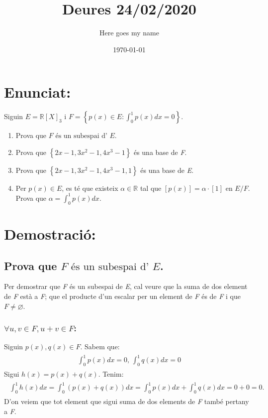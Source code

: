 \documentclass[a4paper, 11pt]{article}
\title{Deures 24/02/2020}
\author{Here goes my name}
\date{\today}
\begin{document}
    \maketitle
    \justify
    \section{Enunciat:}
        Siguin ${E = \mathbb{R}[X]_{3} \text{ i } F = \left\{p(x) \in E: \int_0^1 p(x) dx = 0\right\}}$.
        \begin{enumerate}
            \item Prova que ${F \text{ \'es un subespai d' }E}$.
            \item Prova que ${\left\{2x-1, 3x^2-1, 4x^3-1\right\}}$ \'es una base de \emph{F}.
            \item Prova que ${\left\{2x-1, 3x^2-1, 4x^3-1, 1\right\}}$ \'es una base de \emph{E}.
            \item Per ${p(x) \in E}$, es t\'e que existeix ${\alpha \in \mathbb{R}}$ tal que ${\left[p(x)\right] = \alpha \cdot \left[1\right]}$ en ${E/F}$. Prova que ${\alpha = \int_0^1p(x)dx}$.
        \end{enumerate}

    \section{Demostraci\'o:}
        \subsection{Prova que ${F \text{ \'es un subespai d' }E}$.}
            Per demostrar que \emph{F} \'es un subespai de \emph{E}, cal veure que la suma de dos element de \emph{F} est\`a a \emph{F}; que el producte d'un escalar per un element de \emph{F} \'es de \emph{F} i que ${F \neq \varnothing}$.
            
            \subsubsection{${\forall u,v \in F, u + v\in F}$:}
            Siguin ${p(x),q(x)\in F}$. Sabem que:
            \begin{align*}
                \begin{aligned}
                    \int_0^1 p(x) dx = 0 \text{, }
                    \int_0^1 q(x) dx = 0
                \end{aligned}
            \end{align*}
            Sigui ${h(x) = p(x) + q(x)}$. Tenim:
            \begin{align*}
                \begin{aligned}
                    \int_0^1 h(x)dx = \int_0^1\left(p(x)+q(x)\right)dx = \int_0^1p(x)dx + \int_0^1q(x)dx = 0 + 0 = 0.
                \end{aligned}
            \end{align*}
            D'on veiem que tot element que sigui suma de dos elements de \emph{F} tamb\'e pertany a \emph{F}.
\end{document}

